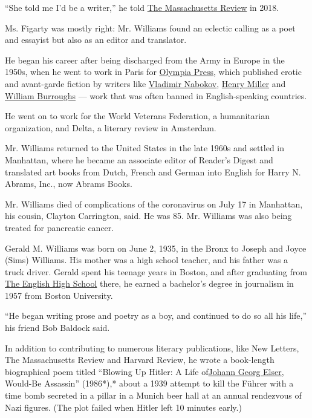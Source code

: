 ``She told me I'd be a writer,'' he told
\href{https://www.massreview.org/node/6609}{The Massachusetts Review} in
2018.

Ms. Figarty was mostly right: Mr. Williams found an eclectic calling as
a poet and essayist but also as an editor and translator.

He began his career after being discharged from the Army in Europe in
the 1950s, when he went to work in Paris for
\href{https://www.nytimes.com/1990/07/05/obituaries/maurice-girodias-a-french-publisher-and-an-author-71.html}{Olympia
Press}, which published erotic and avant-garde fiction by writers like
\href{https://www.nytimes.com/1977/07/05/archives/vladimir-nabokov-author-of-lolita-and-ada-is-dead-vladimir-nabokov.html}{Vladimir
Nabokov},
\href{https://www.nytimes.com/1980/06/09/archives/henry-miller-88-dies-in-california-a-credo-of-hedonism-henry-miller.html}{Henry
Miller} and
\href{https://www.nytimes.com/1997/08/03/nyregion/william-s-burroughs-dies-at-83-member-of-the-beat-generation-wrote-naked-lunch.html}{William
Burroughs} --- work that was often banned in English-speaking countries.

He went on to work for the World Veterans Federation, a humanitarian
organization, and Delta, a literary review in Amsterdam.

Mr. Williams returned to the United States in the late 1960s and settled
in Manhattan, where he became an associate editor of Reader's Digest and
translated art books from Dutch, French and German into English for
Harry N. Abrams, Inc., now Abrams Books.

Mr. Williams died of complications of the coronavirus on July 17 in
Manhattan, his cousin, Clayton Carrington, said. He was 85. Mr. Williams
was also being treated for pancreatic cancer.

Gerald M. Williams was born on June 2, 1935, in the Bronx to Joseph and
Joyce (Sims) Williams. His mother was a high school teacher, and his
father was a truck driver. Gerald spent his teenage years in Boston, and
after graduating from \href{https://www.englishhs.org/}{The English High
School} there, he earned a bachelor's degree in journalism in 1957 from
Boston University.

``He began writing prose and poetry as a boy, and continued to do so all
his life,'' his friend Bob Baldock said.

In addition to contributing to numerous literary publications, like New
Letters, The Massachusetts Review and Harvard Review, he wrote a
book-length biographical poem titled ``Blowing Up Hitler: A Life
of\href{https://www.nytimes.com/2010/10/16/world/europe/16hitler.html}{Johann
Georg Elser}, Would-Be Assassin'' (1986*),* about a 1939 attempt to kill
the Führer with a time bomb secreted in a pillar in a Munich beer hall
at an annual rendezvous of Nazi figures. (The plot failed when Hitler
left 10 minutes early.)

